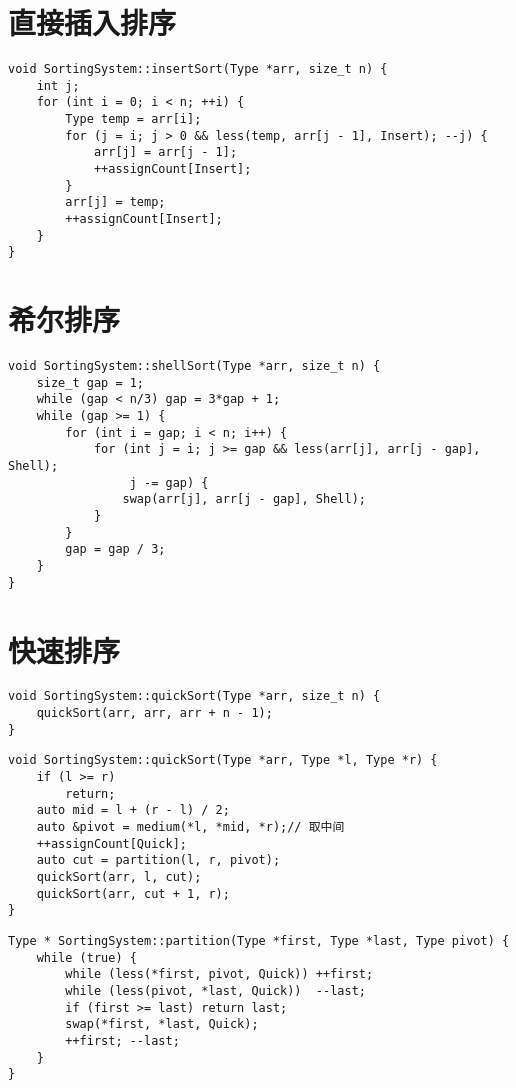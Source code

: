 \section{直接插入排序}
\begin{lstlisting}[firstnumber=120 , caption=insertSort]
void SortingSystem::insertSort(Type *arr, size_t n) {
    int j;
    for (int i = 0; i < n; ++i) {
        Type temp = arr[i];
        for (j = i; j > 0 && less(temp, arr[j - 1], Insert); --j) {
            arr[j] = arr[j - 1];
            ++assignCount[Insert];
        }
        arr[j] = temp;
        ++assignCount[Insert];
    }
}
\end{lstlisting}

\section{希尔排序}
\begin{lstlisting}[firstnumber=134 , caption=shellSort]
void SortingSystem::shellSort(Type *arr, size_t n) {
    size_t gap = 1;
    while (gap < n/3) gap = 3*gap + 1;
    while (gap >= 1) {
        for (int i = gap; i < n; i++) {
            for (int j = i; j >= gap && less(arr[j], arr[j - gap], Shell);
                 j -= gap) {
                swap(arr[j], arr[j - gap], Shell);
            }
        }
        gap = gap / 3;
    }
}
\end{lstlisting}

\section{快速排序}
\begin{lstlisting}[firstnumber=149 , caption=quickSort]
void SortingSystem::quickSort(Type *arr, size_t n) {
    quickSort(arr, arr, arr + n - 1);
}
\end{lstlisting}

\begin{lstlisting}[firstnumber=154]
void SortingSystem::quickSort(Type *arr, Type *l, Type *r) {
    if (l >= r)
        return;
    auto mid = l + (r - l) / 2;
    auto &pivot = medium(*l, *mid, *r);// 取中间
    ++assignCount[Quick];
    auto cut = partition(l, r, pivot);
    quickSort(arr, l, cut);
    quickSort(arr, cut + 1, r);
}
\end{lstlisting}

\begin{lstlisting}[firstnumber=166]
Type * SortingSystem::partition(Type *first, Type *last, Type pivot) {
    while (true) {
        while (less(*first, pivot, Quick)) ++first;
        while (less(pivot, *last, Quick))  --last;
        if (first >= last) return last;
        swap(*first, *last, Quick);
        ++first; --last;
    }
}
\end{lstlisting}

